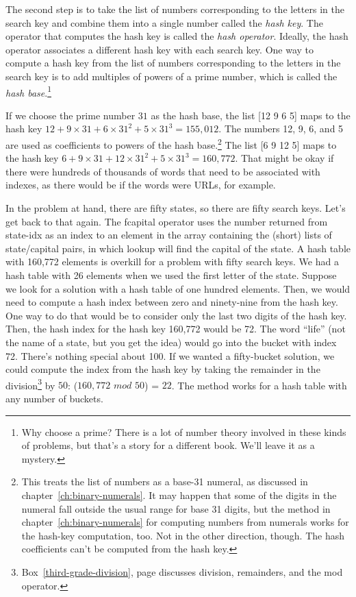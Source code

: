 The second step is to take the list of numbers corresponding
to the letters in the search key
and combine them into a single number called
the \emph{hash key}.
The operator that computes the hash key is called
the \emph{hash operator}.
Ideally, the hash operator associates a different hash key
with each search key.
One way to compute a hash key from the list of numbers
corresponding to the letters in the search key is
to add multiples of powers of a
prime number, which is called the
\emph{hash base}.\footnote{Why choose a prime?
There is a lot of number theory involved in these kinds
of problems, but that's a story for a different book.
We'll leave it as a mystery.}

If we choose the prime number $31$
as the hash base, the list \textsf{[12 9 6 5]} maps to the hash key
$12 + 9\times31 + 6\times31^2 + 5\times31^3 = 155,012$.
The numbers 12, 9, 6, and 5 are used as coefficients to powers of
the hash base.\footnote{This treats the
list of numbers as a base-31 numeral, as
discussed in chapter~\ref{ch:binary-numerals}.
It may happen that some of the digits in the numeral
fall outside the usual range for base 31 digits,
but the method in chapter~\ref{ch:binary-numerals}
for computing numbers from numerals works
for the hash-key computation, too. Not in the other direction, though.
The hash coefficients can't be computed from the hash key.}
The list \textsf{[6 9 12 5]} maps to the hash key
$6 + 9\times31 + 12\times31^2 + 5\times31^3 = 160,772$.
That might be okay if there were hundreds of thousands of words
that need to be associated with indexes, as there would be
if the words were URLs, for example.

In the problem at hand, there are fifty states,
so there are fifty search keys.
Let's get back to that again.
The \textsf{fcapital} operator uses the
number returned from \textsf{state-idx} as an index to
an element in the array containing the (short) lists of
state/capital pairs, in which
\textsf{lookup} will find the capital of the state.
A hash table with 160,772 elements is overkill for
a problem with fifty search keys.
We had a hash table with 26 elements when we used the first letter of the state.
Suppose we look for a solution with a hash table of one hundred elements.
Then, we would need to compute a hash index between zero and ninety-nine
from the hash key. One way to do that would be to
consider only the last two digits of the hash key.
Then, the hash index for the hash key 160,772 would be 72.
The word ``life'' (not the name of a state, but you get the idea)
would go into the bucket
with index 72.
There's nothing special about 100.
If we wanted a fifty-bucket solution,
we could compute the index from the hash key by taking the
remainder in the division\footnote{Box~\ref{third-grade-division},
page \pageref{third-grade-division} discusses
division, remainders, and the \textsf{mod} operator.}
by  $50$: ($160,772$ $mod$ $50$) = $22$.
The method works for a hash table with any number of buckets.

